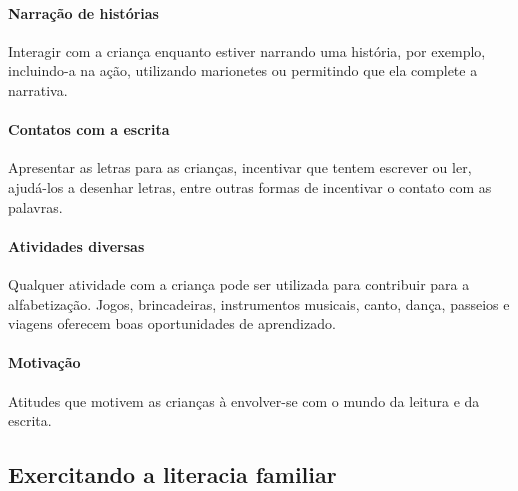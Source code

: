 \documentclass[11pt]{extarticle}
\begin{document}
\paragraph{Narração de histórias} Interagir com a criança enquanto 
estiver narrando uma história, por exemplo, incluindo-a na ação, utilizando 
marionetes ou permitindo que ela complete a narrativa.

\paragraph{Contatos com a escrita} Apresentar as letras para as 
crianças, incentivar que tentem escrever ou ler, ajudá-los a desenhar letras, 
entre outras formas de incentivar o contato com as palavras.

\paragraph{Atividades diversas} Qualquer atividade com a criança 
pode ser utilizada para contribuir para a alfabetização. Jogos, brincadeiras, 
instrumentos musicais, canto, dança, passeios e viagens oferecem boas 
oportunidades de aprendizado.

\paragraph{Motivação} Atitudes que motivem as crianças à envolver-se com 
o mundo da leitura e da escrita.

\subsection{Exercitando a literacia familiar}

\end{document}
